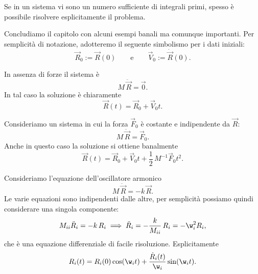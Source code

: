 \begin{oss}
	Se in un sistema vi sono un numero sufficiente di integrali primi, spesso è possibile risolvere esplicitamente il problema.
\end{oss}

Concludiamo il capitolo con alcuni esempi banali ma comunque importanti.
Per semplicità di notazione, adotteremo il seguente simbolismo per i dati iniziali:
\[
	\vec{R}_0 := \vec{R}(0) \qquad\text{e}\qquad \vec{V}_0 := \dot{\vec{R}}(0).
\]

\begin{ese}
	In assenza di forze il sistema è
	\[
		M\,\ddot{\vec{R}} = \vec{0}.
	\]
	In tal caso la soluzione è chiaramente
	\[
		\vec{R}(t) = \vec{R}_0 + \vec{V}_0 t.
	\]
\end{ese}

\begin{ese}
	Consideriamo un sistema in cui la forza \(\vec{F}_0\) è costante e indipendente da \(\vec{R}\):
	\[
		M\,\ddot{\vec{R}} = \vec{F}_0.
	\]
	Anche in questo caso la soluzione si ottiene banalmente
	\[
		\vec{R}(t) = \vec{R}_0 + \vec{V}_0 t + \frac{1}{2}\,M^{-1}\vec{F}_0 t^2.
	\]
\end{ese}

\begin{ese}
	Consideriamo l'equazione dell'oscillatore armonico
	\[
		M\,\ddot{\vec{R}} = - k\,\vec{R}.
	\]
	Le varie equazioni sono indipendenti dalle altre, per semplicità possiamo quindi considerare una singola componente:
	\[
		M_{ii}\ddot{R}_i = -k\,R_i \implies \ddot{R}_i = -\frac{k}{M_{ii}}\,R_i = -\w_i^2 R_i,
	\]
	che è una equazione differenziale di facile risoluzione. Esplicitamente
	\[
		R_i(t) = R_i(0)\cos(\w_i t) + \frac{\dot{R}_i(t)}{\w_i}\sin(\w_i t).
	\]
\end{ese}